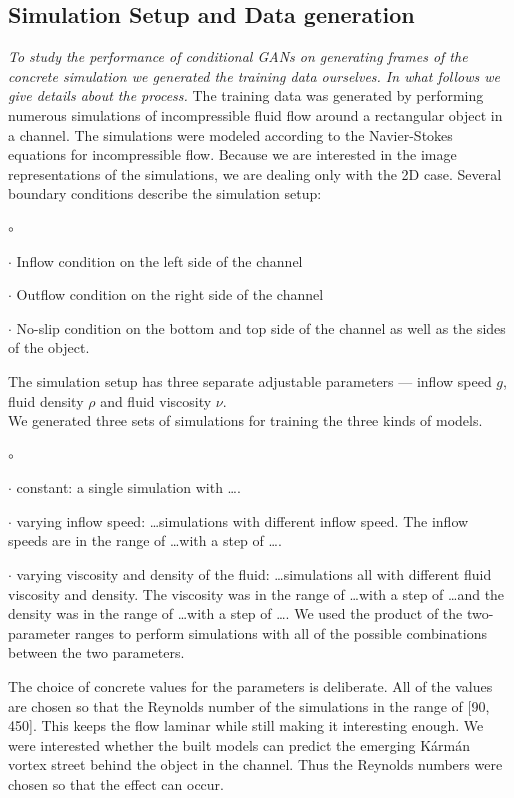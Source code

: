 \documentclass{llncs}
\begin{document}
\subsection{Simulation Setup and Data generation}
\emph{To study the performance of conditional GANs on generating frames of the concrete simulation we generated the training data ourselves. In what follows we give details about the process.} The training data was generated by performing numerous simulations of incompressible fluid flow around a rectangular object in a channel. The simulations were modeled according to the Navier-Stokes equations for incompressible flow. Because we are interested in the image representations of the simulations, we are dealing only with the 2D case. Several boundary conditions describe the simulation setup:
\begin{list}{$\circ$}{}
\item[$\cdot$] Inflow condition on the left side of the channel
\item[$\cdot$] Outflow condition on the right side of the channel
\item[$\cdot$] No-slip condition on the bottom and top side of the channel as well as the sides of the object.
\end{list}
The simulation setup has three separate adjustable parameters --- inflow speed $g$, fluid density $\rho$ and fluid viscosity $\nu$.
\\
We generated three sets of simulations for training the three kinds of models.
\begin{list}{$\circ$}{}
\item[$\cdot$] constant: a single simulation with \ldots.
\item[$\cdot$] varying inflow speed: \ldots simulations with different inflow speed. The inflow speeds are in the range of \ldots with a step of \ldots.
\item[$\cdot$] varying viscosity and density of the fluid: \ldots simulations all with different fluid viscosity and density. The viscosity was in the range of \ldots with a step of \ldots and the density was in the range of \ldots with a step of \ldots. We used the product of the two-parameter ranges to perform simulations with all of the possible combinations between the two parameters.
\end{list}

The choice of concrete values for the parameters is deliberate. All of the values are chosen so that the Reynolds number of the simulations in the range of [90, 450]. This keeps the flow laminar while still making it interesting enough. We were interested whether the built models can predict the emerging Kármán vortex street behind the object in the channel. Thus the Reynolds numbers were chosen so that the effect can occur.
\end{document}
